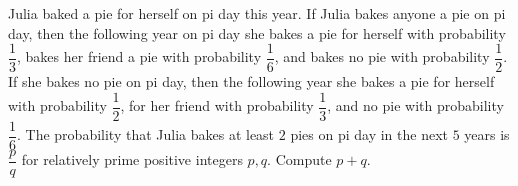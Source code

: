 Julia baked a pie for herself on pi day this year. If Julia bakes anyone a pie on pi day, then the following year on pi day she bakes a pie for herself with probability $\dfrac13$, bakes her friend a pie with probability $\dfrac16$, and bakes no pie with probability $\dfrac12$. If she bakes no pie on pi day, then the following year she bakes a pie for herself with probability $\dfrac12$, for her friend with probability $\dfrac13$, and no pie with probability $\dfrac16$. The probability that Julia bakes at least $2$ pies on pi day in the next $5$ years is $\dfrac pq$ for relatively prime positive integers $p,q$. Compute $p+q$.
